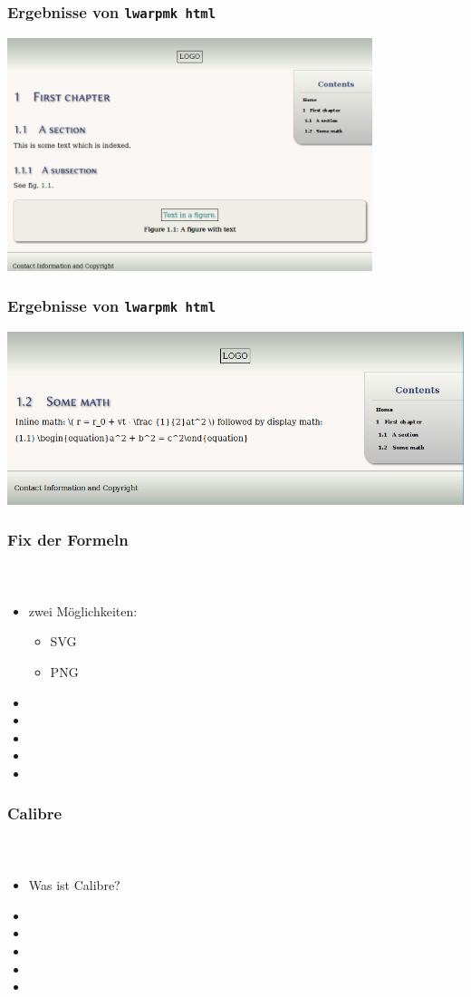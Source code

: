\documentclass[12pt,ngerman]{beamer}
\begin{document}
\begin{frame}
\frametitle{Ergebnisse von \texttt{lwarpmk html}}

\begin{center}
\includegraphics[width=0.8\textwidth]{lwarp-manual-example/bild-02.png}
\end{center}

\end{frame}


\begin{frame}
\frametitle{Ergebnisse von \texttt{lwarpmk html}}

\begin{center}
\includegraphics[width=\textwidth]{lwarp-manual-example/bild-03.png}
\end{center}

\end{frame}


\begin{frame}
\frametitle{Fix der Formeln}
\framesubtitle{~}

\begin{itemize}
\item zwei Möglichkeiten:

\begin{itemize}
	\item SVG
	\item PNG
\end{itemize}

\item 
\item 
\item 
\item 
\item 
\end{itemize}
\end{frame}



\begin{frame}
\frametitle{Calibre}
\framesubtitle{~}

\begin{itemize}
\item Was ist Calibre?
\item 
\item 
\item 
\item 
\item 
\end{itemize}
\end{frame}
\end{document}
